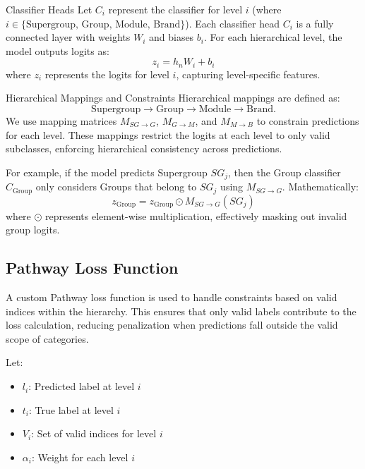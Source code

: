 \documentclass[9pt,a4paper,twoside]{rho-class/rho}
\begin{document}
        Classifier Heads  
        Let \( C_i \) represent the classifier for level \( i \) (where \( i \in \{\text{Supergroup, Group, Module, Brand}\} \)). Each classifier head \( C_i \) is a fully connected layer with weights \( W_i \) and biases \( b_i \). For each hierarchical level, the model outputs logits as:
        \[
        z_i = h_n W_i + b_i
        \]
        where \( z_i \) represents the logits for level \( i \), capturing level-specific features.
        
        Hierarchical Mappings and Constraints  
        Hierarchical mappings are defined as:
        \[
        \text{Supergroup} \rightarrow \text{Group} \rightarrow \text{Module} \rightarrow \text{Brand}.
        \]
        We use mapping matrices \( M_{SG \rightarrow G} \), \( M_{G \rightarrow M} \), and \( M_{M \rightarrow B} \) to constrain predictions for each level. These mappings restrict the logits at each level to only valid subclasses, enforcing hierarchical consistency across predictions.
        
        For example, if the model predicts Supergroup \( SG_j \), then the Group classifier \( C_{\text{Group}} \) only considers Groups that belong to \( SG_j \) using \( M_{SG \rightarrow G} \). Mathematically:
        \[
        z_{\text{Group}} = z_{\text{Group}} \odot M_{SG \rightarrow G}(SG_j)
        \]
        where \( \odot \) represents element-wise multiplication, effectively masking out invalid group logits.

  \subsection{Pathway Loss Function}
    
        A custom Pathway loss function is used to handle constraints based on valid indices within the hierarchy. This ensures that only valid labels contribute to the loss calculation, reducing penalization when predictions fall outside the valid scope of categories.
        
        Let:
        \begin{itemize}
        \item \( l_i \): Predicted label at level \( i \)
        \item \( t_i \): True label at level \( i \)
        \item \( V_i \): Set of valid indices for level \( i \)
        \item \( \alpha_i \): Weight for each level \( i \)
    \end{itemize}
        
\end{document}
